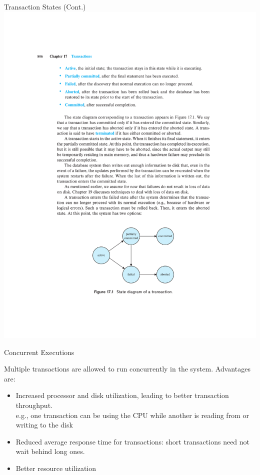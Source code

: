\documentclass{beamer}
\begin{document}
\begin{frame}{Transaction States (Cont.)}
    \centering
    \includegraphics[width=\textwidth, trim={5.5cm 3cm 5cm 18cm}, clip]{figures/p835_stages.pdf}
\end{frame}

\begin{frame}{Concurrent Executions}

    Multiple transactions are allowed to run concurrently in the system.  Advantages are:
        \begin{itemize}
            \item Increased processor and disk utilization, leading to better transaction throughput. \\        \quad e.g., one transaction can be using the CPU while another is reading from or writing to    the disk
            \item Reduced average response time for transactions: short transactions need not wait behind long ones.
            \item Better resource utilization
        \end{itemize}

\end{frame}
\end{document}

